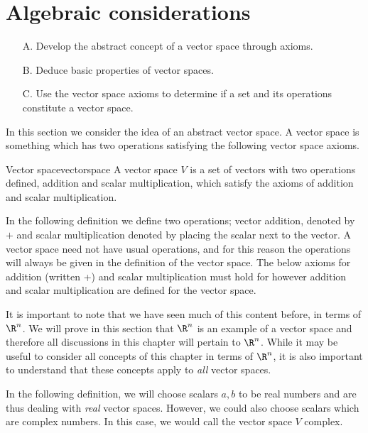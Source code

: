 \section{Algebraic considerations}

\begin{outcome}
\begin{enumerate}
\item[A.] Develop the abstract concept of a vector space through axioms.

\item[B.] Deduce basic properties of vector spaces.

\item[C.]  Use the vector space axioms to determine if a set and its operations constitute a vector space.
\end{enumerate}
\end{outcome}

In this section we consider the idea of an abstract vector space. A vector space is
something which has two operations satisfying the following vector space
axioms.

\begin{definition}{Vector space}{vectorspace}
A vector space $V$ is a set of vectors with two operations defined, addition and scalar multiplication, which satisfy the axioms of addition and scalar multiplication. 
\end{definition}

In the following definition we define two operations; vector addition, denoted by $+$ and scalar
multiplication denoted by placing the scalar next to the vector. A vector space need not have usual operations, and for this reason the operations will always be given in the definition of the vector space. The below axioms for addition (written +) and scalar multiplication must hold for however addition and scalar multiplication are defined for the vector space.  

It is important to note that we have seen much of this content before, in terms of $\R^n$. We will prove in this section that $\R^n$ is an example of a vector space and therefore all discussions in this chapter will pertain to $\R^n$. While it may be useful to consider all concepts of this chapter in terms of $\R^n$, it is also important to understand that these concepts apply to \textit{all} vector spaces. 

In the following definition, we will choose scalars $a,b$ to be real numbers and are thus dealing with \textit{real} vector spaces. However, we could also choose scalars which are complex numbers. In this case, we would call the vector space $V$ complex. 

